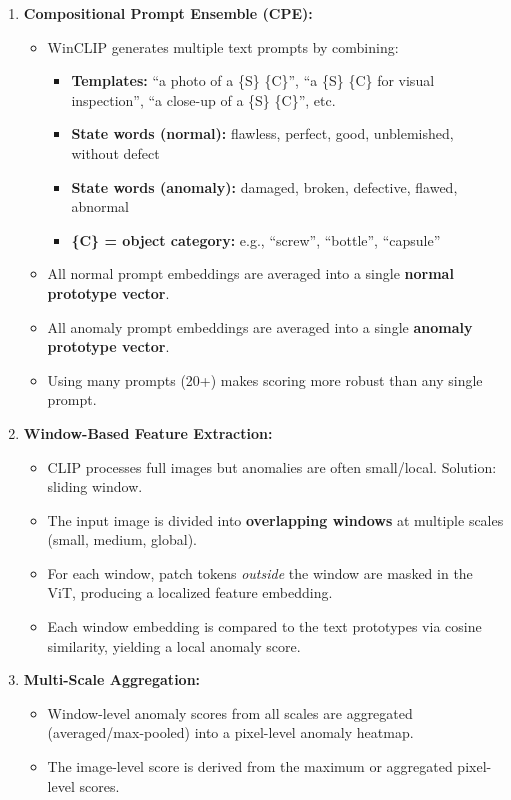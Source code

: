 \documentclass[12pt, a4paper]{article}
\begin{document}
\begin{enumerate}[leftmargin=*]
    \item \textbf{Compositional Prompt Ensemble (CPE):}
    \begin{itemize}
        \item WinCLIP generates multiple text prompts by combining:
        \begin{itemize}
            \item \textbf{Templates:} ``a photo of a \{S\} \{C\}'', ``a \{S\} \{C\} for visual inspection'', ``a close-up of a \{S\} \{C\}'', etc.
            \item \textbf{State words (normal):} flawless, perfect, good, unblemished, without defect
            \item \textbf{State words (anomaly):} damaged, broken, defective, flawed, abnormal
            \item \textbf{\{C\} = object category:} e.g., ``screw'', ``bottle'', ``capsule''
        \end{itemize}
        \item All normal prompt embeddings are averaged into a single \textbf{normal prototype vector}.
        \item All anomaly prompt embeddings are averaged into a single \textbf{anomaly prototype vector}.
        \item Using many prompts (20+) makes scoring more robust than any single prompt.
    \end{itemize}

    \item \textbf{Window-Based Feature Extraction:}
    \begin{itemize}
        \item CLIP processes full images but anomalies are often small/local. Solution: sliding window.
        \item The input image is divided into \textbf{overlapping windows} at multiple scales (small, medium, global).
        \item For each window, patch tokens \textit{outside} the window are masked in the ViT, producing a localized feature embedding.
        \item Each window embedding is compared to the text prototypes via cosine similarity, yielding a local anomaly score.
    \end{itemize}

    \item \textbf{Multi-Scale Aggregation:}
    \begin{itemize}
        \item Window-level anomaly scores from all scales are aggregated (averaged/max-pooled) into a pixel-level anomaly heatmap.
        \item The image-level score is derived from the maximum or aggregated pixel-level scores.
    \end{itemize}


\end{enumerate}
\end{document}
